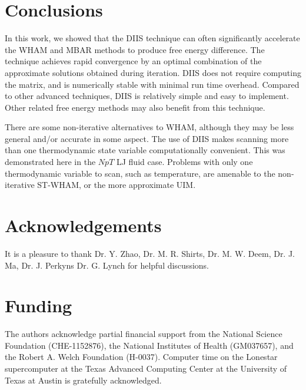 \documentclass{gMOS2e}
\begin{document}
\section{Conclusions}



In this work, we showed that the DIIS technique
can often significantly accelerate
the WHAM and MBAR methods to produce free energy difference.
%
The technique achieves rapid convergence
by an optimal combination of the approximate
solutions obtained during iteration.
%
DIIS does not require computing
the  matrix,
and is numerically stable
with minimal run time overhead.
%
Compared to other advanced techniques\cite{
shirts2008, zhu2012},
DIIS is relatively simple and easy to implement.
%
Other related free energy methods\cite{
shen1991, woolf1994, crouzy1994, roux1995}
may also benefit from this technique.
%



There are some non-iterative alternatives to WHAM,
although they may be less general and/or accurate
in some aspect.
%
The use of DIIS makes scanning more than one thermodynamic state variable
computationally convenient.
%
This was demonstrated here in the $NpT$ LJ fluid case.
%
Problems with only one thermodynamic variable to scan, such as temperature,
are amenable to the non-iterative ST-WHAM,
or the more approximate UIM.
%



\section*{Acknowledgements}





It is a pleasure to thank
Dr. Y. Zhao,
Dr. M. R. Shirts,
Dr. M. W. Deem,
Dr. J. Ma,
Dr. J. Perkyns Dr. G. Lynch
for helpful discussions.
%


\section*{Funding}


The authors acknowledge
partial financial support from
the National Science Foundation (CHE-1152876),
the National Institutes of Health (GM037657),
and
the Robert A. Welch Foundation (H-0037).
%
Computer time on the Lonestar supercomputer
at the Texas Advanced Computing Center
at the University of Texas at Austin
is gratefully acknowledged.
\end{document}
